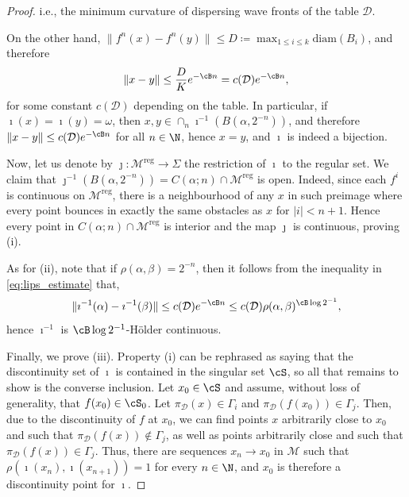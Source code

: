 \documentclass[reqno,11pt]{amsart}
\begin{document}
\begin{proof}
    i.e., the minimum curvature of dispersing wave fronts of the table \( \mathcal{D} \).
    \par On the other hand, \( \|f^n(x) - f^n(y)\| \leq D \coloneqq \max_{1 \leq i \leq k} \mathrm{diam}(B_i) \), and therefore
    \begin{equation}\label{eq:lips_estimate}
        \|x -y\| \leq \frac{D}{K}e^{-\cB n} = c(\mathcal{D})e^{-\cB n},
    \end{equation}
    for some constant \( c(\mathcal{D}) \) depending on the table. 
    In particular, if \( \imath(x) = \imath(y) = \omega \), then \( x, y \in \cap_{n}\imath^{-1}(B(\alpha, 2^{-n})) \), and therefore 
     \( \|x -y\| \leq c(\mathcal{D})e^{-\cB n} \) for all \( n \in \N \), hence \( x = y \), and \( \imath \) is indeed a bijection.     
    \par Now, let us denote by \( \jmath \colon \mathcal{M}^\mathrm{reg} \to \Sigma \) the restriction of \( \imath \) to the regular set.
    We claim that \( \jmath^{-1}(B(\alpha, 2^{-n})) = C(\alpha; n)\cap\mathcal{M}^\mathrm{reg} \) is open.
    Indeed, since each \( f^i \) is continuous on \( \mathcal{M}^\mathrm{reg} \), there is a neighbourhood of any \( x \) in such preimage where every point bounces in exactly the same obstacles as \( x \) for \( |i| < n+1 \).
    Hence every point in \( C(\alpha; n)\cap\mathcal{M}^\mathrm{reg} \) is interior and the map \( \jmath \) is continuous, proving (i).
    \par As for (ii), note that if \( \rho(\alpha, \beta) = 2^{-n} \), then it follows from the inequality in \eqref{eq:lips_estimate} that, 
    \[
        \|\imath^{-1}(\alpha)-\imath^{-1}(\beta)\|  \leq c(\mathcal{D})e^{-\cB n} \leq c(\mathcal{D})\rho(\alpha, \beta)^{\cB \log 2^{-1}},
    \]
    hence \( \imath^{-1} \) is \( \cB \log 2^{-1}\)-Hölder continuous. 
    \par Finally, we prove (iii).
    Property (i) can be rephrased as saying that the discontinuity set of \( \imath \) is contained in the singular set \( \cS \), so all that remains to show is the converse inclusion.
    Let \( x_0 \in \cS \) and assume, without loss of generality, that \( f(x_0) \in \cS_0 \). 
    Let \( \pi_\mathcal{D}(x) \in \Gamma_i \) and \( \pi_\mathcal{D}(f(x_0)) \in \Gamma_j \).
    Then, due to the discontinuity of \( f \) at \( x_0 \), we can find points \( x \) arbitrarily close to \( x_0 \) and such that \( \pi_\mathcal{D}(f(x)) \notin \Gamma_j \), as well as points arbitrarily close and such that \( \pi_\mathcal{D}(f(x)) \in \Gamma_j \). 
    Thus, there are sequences \( x_n \to x_0 \) in \( \mathcal{M} \) such that \( \rho(\imath(x_n), \imath(x_{n+1})) = 1 \) for every \( n\in \N \), and \( x_0 \) is therefore a discontinuity point for \( \imath \).\qedhere
\end{proof}
\end{document}

